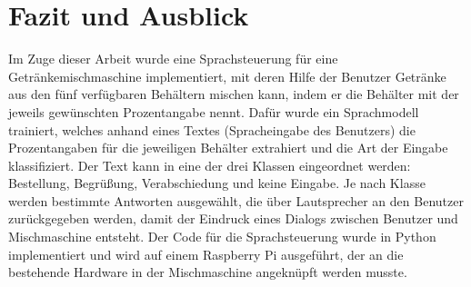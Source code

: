 \chapter{Fazit und Ausblick}
Im Zuge dieser Arbeit wurde eine Sprachsteuerung für eine Getränkemischmaschine implementiert, mit deren Hilfe der Benutzer Getränke aus den fünf verfügbaren Behältern mischen kann, indem er die Behälter mit der jeweils gewünschten Prozentangabe nennt. Dafür wurde ein Sprachmodell trainiert, welches anhand eines Textes (Spracheingabe des Benutzers) die Prozentangaben für die jeweiligen Behälter extrahiert und die Art der Eingabe klassifiziert. Der Text kann in eine der drei Klassen eingeordnet werden: Bestellung, Begrüßung, Verabschiedung und keine Eingabe. Je nach Klasse werden bestimmte Antworten ausgewählt, die über Lautsprecher an den Benutzer zurückgegeben werden, damit der Eindruck eines Dialogs zwischen Benutzer und Mischmaschine entsteht. Der Code für die Sprachsteuerung wurde in Python implementiert und wird auf einem Raspberry Pi ausgeführt, der an die bestehende Hardware in der Mischmaschine angeknüpft werden musste.
